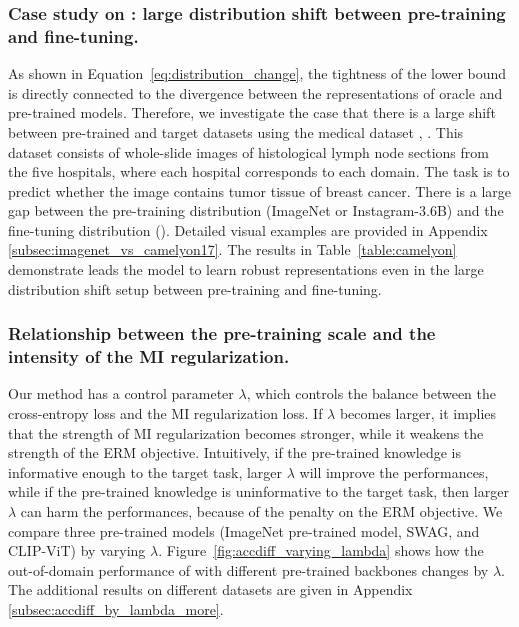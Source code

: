 \subsubsection{Case study on : large distribution shift between pre-training and fine-tuning.} As shown in Equation~\eqref{eq:distribution_change}, the tightness of the lower bound is directly connected to the divergence between the representations of oracle and pre-trained models. Therefore, we investigate the case that there is a large shift between pre-trained and target datasets using the medical dataset \cite{bandi2018camelyon17,koh2021wilds}, . %
This dataset consists of whole-slide images of histological lymph node sections from the five hospitals, where each hospital corresponds to each domain.
The task is to predict whether the image contains tumor tissue of breast cancer. There is a large gap between the pre-training distribution (ImageNet or Instagram-3.6B) and the fine-tuning distribution (). Detailed visual examples are provided in Appendix \ref{subsec:imagenet_vs_camelyon17}. The results in Table~\ref{table:camelyon} demonstrate \method{} leads the model to learn robust representations even in the large distribution shift setup between pre-training and fine-tuning.




\subsubsection{Relationship between the pre-training scale and the intensity of the MI regularization.}
Our method has a control parameter $\lambda$, which controls the balance between the cross-entropy loss and the MI regularization loss. If $\lambda$ becomes larger, it implies that the strength of MI regularization becomes stronger, while it weakens the strength of the ERM objective. Intuitively, if the pre-trained knowledge is informative enough to the target task, larger $\lambda$ will improve the performances, while if the pre-trained knowledge is uninformative to the target task, then larger $\lambda$ can harm the performances, because of the penalty on the ERM objective.
We compare three pre-trained models (ImageNet pre-trained model, SWAG, and CLIP-ViT) by varying $\lambda$.
Figure~\ref{fig:accdiff_varying_lambda} shows how the out-of-domain performance of \method{} with different pre-trained backbones changes by $\lambda$. The additional results on different datasets are given in Appendix \ref{subsec:accdiff_by_lambda_more}.

